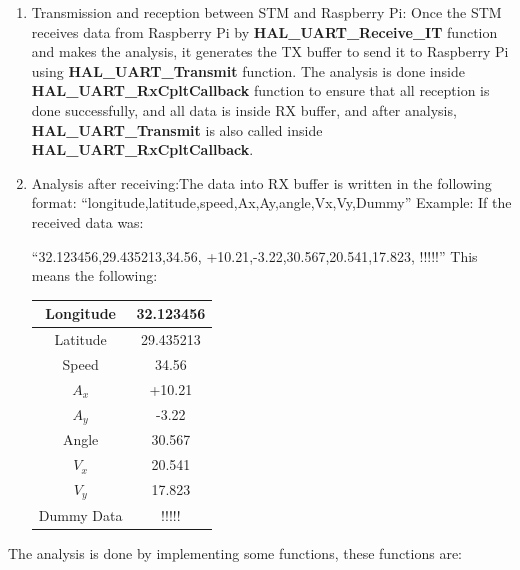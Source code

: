 \begin{enumerate}
    \item Transmission and reception between STM and Raspberry Pi:
Once the STM receives data from Raspberry Pi by \textbf{HAL\_UART\_Receive\_IT }function and makes the analysis, it generates the TX buffer to send it to Raspberry Pi using \textbf{HAL\_UART\_Transmit} function.
The analysis is done inside \textbf{HAL\_UART\_RxCpltCallback} function to ensure that all reception is done successfully, and all data is inside RX buffer, and after analysis, \textbf{HAL\_UART\_Transmit} is
also called inside \textbf{HAL\_UART\_RxCpltCallback}.
    \item Analysis after receiving:The data into RX buffer is written in the following format:
“longitude,latitude,speed,Ax,Ay,angle,Vx,Vy,Dummy”
Example:
If the received data was: 

“32.123456,29.435213,34.56, +10.21,-3.22,30.567,20.541,17.823, !!!!!”
This means the following:


\bgroup
\def\arraystretch{1.5}%
\begin{table}[h]
\centering
\begin{tabular}{| c | c |}
\hline
 Longitude &32.123456 \\
 \hline
 Latitude &  29.435213 \\
 \hline
 Speed & 34.56 \\ 
 \hline
 $A_x$ & +10.21  \\
 \hline
 $A_y$ & -3.22  \\
 \hline
 Angle & 30.567  \\
 \hline
 $V_x$ & 20.541 \\
 \hline
 $V_y$ & 17.823 \\
 \hline
 Dummy Data & !!!!!  \\
 \hline

\end{tabular}
\end{table}
\egroup

\end{enumerate}

The analysis is done by implementing some functions, these functions are:

